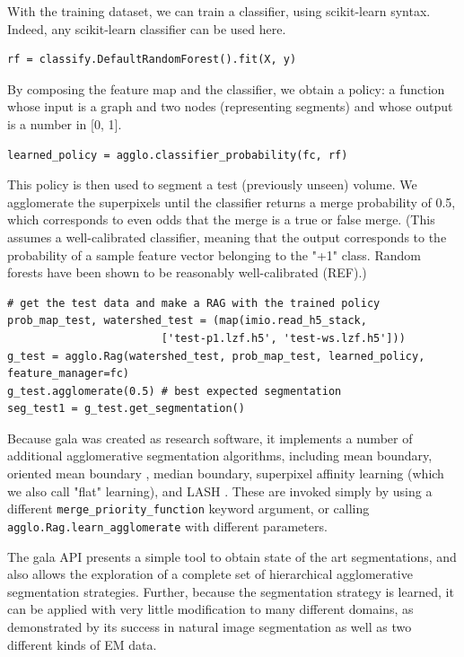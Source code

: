 \documentclass{frontiersSCNS} %
\begin{document}
With the training dataset, we can train a classifier, using scikit-learn syntax.
Indeed, any scikit-learn classifier can be used here.

{\small
\begin{verbatim}
rf = classify.DefaultRandomForest().fit(X, y)
\end{verbatim}
}

By composing the feature map and the classifier, we obtain a policy: a function whose input is a graph and two nodes (representing segments) and whose output is a number in [0, 1].

{\small
\begin{verbatim}
learned_policy = agglo.classifier_probability(fc, rf)
\end{verbatim}
}

This policy is then used to segment a test (previously unseen) volume.
We agglomerate the superpixels until the classifier returns a merge probability of 0.5, which corresponds to even odds that the merge is a true or false merge.
(This assumes a well-calibrated classifier, meaning that the output corresponds to the probability of a sample feature vector belonging to the "+1" class.
Random forests have been shown to be reasonably well-calibrated (REF).)

{\small
\begin{verbatim}
# get the test data and make a RAG with the trained policy
prob_map_test, watershed_test = (map(imio.read_h5_stack,
                        ['test-p1.lzf.h5', 'test-ws.lzf.h5']))
g_test = agglo.Rag(watershed_test, prob_map_test, learned_policy, feature_manager=fc)
g_test.agglomerate(0.5) # best expected segmentation
seg_test1 = g_test.get_segmentation()
\end{verbatim}
}

Because gala was created as research software, it implements a number of additional agglomerative segmentation algorithms, including mean boundary, oriented mean boundary \citep{Arbelaez:jg}, median boundary, superpixel affinity learning \citep{Ren:2003jg} (which we also call "flat" learning), and LASH \citep{Jain:2011vr}.
These are invoked simply by using a different \texttt{\small merge\_priority\_function} keyword argument, or calling \texttt{\small agglo.Rag.learn\_agglomerate} with different parameters.

The gala API presents a simple tool to obtain state of the art segmentations, and also allows the exploration of a complete set of hierarchical agglomerative segmentation strategies.
Further, because the segmentation strategy is learned, it can be applied with very little modification to many different domains, as demonstrated by its success in natural image segmentation as well as two different kinds of EM data.
\end{document}
